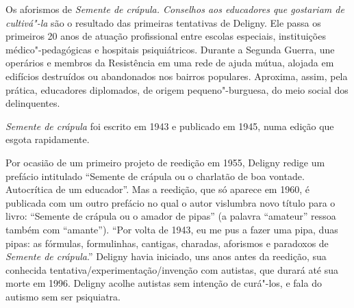 




\pagebreak
\thispagestyle{empty}
\movetooddpage
\thispagestyle{empty}
\setcounter{footnote}{0}
\begin{vplace}[0.25]


{\large{}}
\end{vplace}

\pagebreak
\thispagestyle{empty}

\movetooddpage

Os aforismos de \emph{Semente de crápula. Conselhos aos educadores que
gostariam de cultivá"-la} são o resultado das primeiras tentativas de Deligny.
Ele passa os primeiros 20 anos de atuação profissional entre escolas
especiais, instituições médico"-pedagógicas e hospitais psiquiátricos.
Durante a Segunda Guerra, une operários e membros da Resistência em uma
rede de ajuda mútua, alojada em edifícios destruídos ou abandonados nos
bairros populares. Aproxima, assim, pela prática, educadores diplomados,
de origem pequeno"-burguesa, do meio social dos delinquentes.

\emph{Semente de crápula} foi escrito em 1943 e publicado em 1945, numa
edição que esgota rapidamente.

Por ocasião de um primeiro projeto de reedição em 1955, Deligny redige
um prefácio intitulado ``Semente de crápula ou o charlatão de boa
vontade. Autocrítica de um educador''. Mas a reedição, que só aparece em
1960, é publicada com um outro prefácio no qual o autor vislumbra novo
título para o livro: ``Semente de crápula ou o amador de pipas'' (a
palavra ``amateur'' ressoa também com ``amante''). ``Por volta de 1943, eu
me pus a fazer uma pipa, duas pipas: as fórmulas, formulinhas, cantigas,
charadas, aforismos e paradoxos de \emph{Semente de crápula}.'' Deligny
havia iniciado, uns anos antes da reedição, sua conhecida
tentativa/experimentação/invenção com autistas, que durará até sua morte
em 1996. Deligny acolhe autistas sem intenção de curá"-los, e fala do
autismo sem ser psiquiatra.

